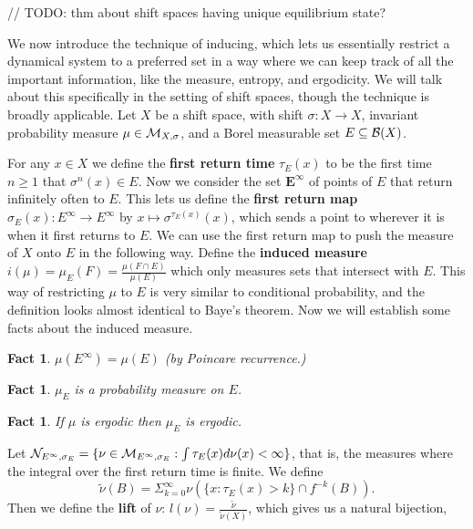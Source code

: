 \documentclass[11pt, reqno]{amsart}
\theoremstyle{plain}
\numberwithin{thm}{subsection}
\newtheorem{fact}[thm]{Fact}
\theoremstyle{definition}
\begin{document}
// TODO: thm about shift spaces having unique equilibrium state?

We now introduce the technique of inducing, which lets us essentially restrict a dynamical system to a preferred set in a way where we can keep track of all the important information, like the measure, entropy, and ergodicity. We will talk about this specifically in the setting of shift spaces, though the technique is broadly applicable. Let $X$ be a shift space, with shift $\sigma: X \rightarrow X$, invariant probability measure $\mu \in \mathcal{M}_{X, \sigma}$, and a Borel measurable set $E \subseteq \mathcal{B}(X)$. 

For any $x \in X$ we define the \textbf{first return time} $\tau_E(x)$ to be the first time $n \ge 1$ that $\sigma^n(x) \in E$. Now we consider the set $\boldsymbol{E^\infty}$ of points of $E$ that return infinitely often to $E$. This lets us define the \textbf{first return map} $\sigma_E(x): E^\infty \rightarrow E^\infty$ by $x \mapsto \sigma^{\tau_E(x)}(x)$, which sends a point to wherever it is when it first returns to $E$. We can use the first return map to push the measure of $X$ onto $E$ in the following way. Define the \textbf{induced measure} $i(\mu) = \mu_E(F) = \frac{\mu(F \cap E)}{\mu(E)}$ which only measures sets that intersect with $E$. This way of restricting $\mu$ to $E$ is very similar to conditional probability, and the definition looks almost identical to Baye's theorem. Now we will establish some facts about the induced measure. 

\begin{fact}
  $\mu(E^\infty) = \mu(E)$ (by Poincare recurrence.)
\end{fact}

\begin{fact}
  $\mu_E$ is a probability measure on $E$.
\end{fact}

\begin{fact}
  If $\mu$ is ergodic then $\mu_E$ is ergodic.
\end{fact}

Let $\mathcal{N}_{E^\infty, \sigma_E} = \{\nu \in \mathcal{M}_{E^\infty, \sigma_E} : \int \tau_E(x) d\nu(x) < \infty \}$, that is, the measures where the integral over the first return time is finite. We define $$\tilde{\nu}(B) = \Sigma_{k=0}^{\infty}\nu(\{x : \tau_E(x) > k\} \cap f^{-k}(B)).$$ Then we define the \textbf{lift} of $\nu$: $l(\nu) = \frac{\tilde{\nu}}{\tilde{\nu}(X)}$, which gives us a natural bijection,
\end{document}
